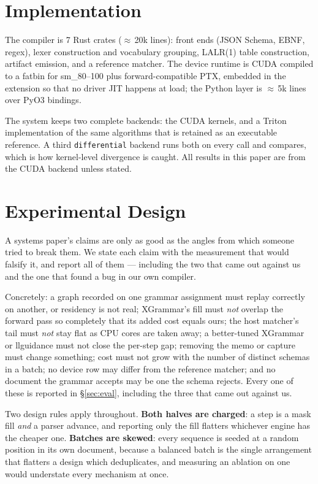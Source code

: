 \documentclass{article}
\begin{document}
\section{Implementation}
\label{sec:impl}

The compiler is 7 Rust crates ($\approx$\,20k lines): front ends (JSON Schema,
EBNF, regex), lexer construction and vocabulary grouping, LALR(1) table
construction, artifact emission, and a reference matcher. The device runtime is
CUDA compiled to a fatbin for sm\_80--100 plus forward-compatible PTX, embedded
in the extension so that no driver JIT happens at load; the Python layer is
$\approx$\,5k lines over PyO3 bindings.

The system keeps two complete backends: the CUDA kernels, and a Triton
implementation of the same algorithms that is retained as an executable
reference. A third \texttt{differential} backend runs both on every call and
compares, which is how kernel-level divergence is caught. All results in this
paper are from the CUDA backend unless stated.

\section{Experimental Design}
\label{sec:design-exp}

A systems paper's claims are only as good as the angles from which someone
tried to break them. We state each claim with the measurement that would
falsify it, and report all of them --- including the two that came out against
us and the one that found a bug in our own compiler.

Concretely: a graph recorded on one grammar assignment must replay correctly on
another, or residency is not real; XGrammar's fill must \emph{not} overlap the
forward pass so completely that its added cost equals ours; the host matcher's
tail must \emph{not} stay flat as CPU cores are taken away; a better-tuned
XGrammar or llguidance must not close the per-step gap; removing the memo or
capture must change something; cost must not grow with the number of distinct
schemas in a batch; no device row may differ from the reference matcher; and no
document the grammar accepts may be one the schema rejects. Every one of these
is reported in \S\ref{sec:eval}, including the three that came out against us.

Two design rules apply throughout. \textbf{Both halves are charged}: a step is a
mask fill \emph{and} a parser advance, and reporting only the fill flatters
whichever engine has the cheaper one. \textbf{Batches are skewed}: every
sequence is seeded at a random position in its own document, because a balanced
batch is the single arrangement that flatters a design which deduplicates, and
measuring an ablation on one would understate every mechanism at once.
\end{document}
